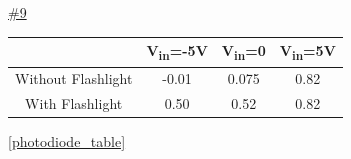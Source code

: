 




\underline{\#9}

\centering
\begin{tabular}{| c | c | c | c |}\hline
	& V\textsubscript{in}=-5V & V\textsubscript{in}=0 & V\textsubscript{in}=5V \\\hline
	Without Flashlight & -0.01 & 0.075 & 0.82\\\hline
	With Flashlight & 0.50 & 0.52 & 0.82 \\\hline
\end{tabular}
\label{Voltage over Photodiode}
\ref{photodiode_table}
\\

